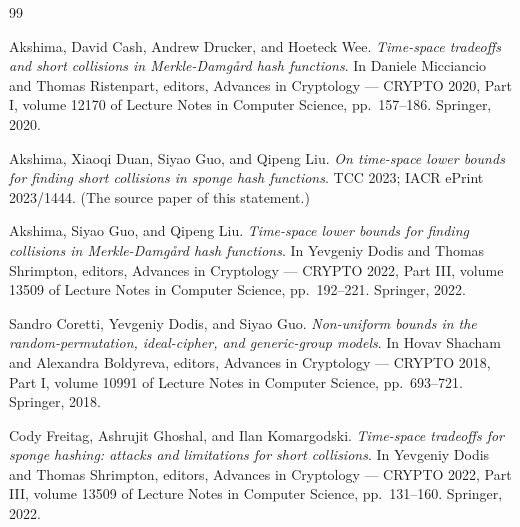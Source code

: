 \documentclass{conjura-conjecture}
\begin{document}
\begin{conjurabibliography}{99}

Akshima, David Cash, Andrew Drucker, and Hoeteck Wee.
\emph{Time-space tradeoffs and short collisions in Merkle-Damg\aa{}rd
hash functions}.
In Daniele Micciancio and Thomas Ristenpart, editors, Advances in
Cryptology --- CRYPTO 2020, Part I, volume 12170 of Lecture Notes in
Computer Science, pp.\ 157--186. Springer, 2020.

Akshima, Xiaoqi Duan, Siyao Guo, and Qipeng Liu.
\emph{On time-space lower bounds for finding short collisions in sponge
hash functions}.
TCC 2023; IACR ePrint 2023/1444. (The source paper of this statement.)

Akshima, Siyao Guo, and Qipeng Liu.
\emph{Time-space lower bounds for finding collisions in
Merkle-Damg\aa{}rd hash functions}.
In Yevgeniy Dodis and Thomas Shrimpton, editors, Advances in Cryptology
--- CRYPTO 2022, Part III, volume 13509 of Lecture Notes in Computer
Science, pp.\ 192--221. Springer, 2022.

Sandro Coretti, Yevgeniy Dodis, and Siyao Guo.
\emph{Non-uniform bounds in the random-permutation, ideal-cipher, and
generic-group models}.
In Hovav Shacham and Alexandra Boldyreva, editors, Advances in
Cryptology --- CRYPTO 2018, Part I, volume 10991 of Lecture Notes in
Computer Science, pp.\ 693--721. Springer, 2018.

Cody Freitag, Ashrujit Ghoshal, and Ilan Komargodski.
\emph{Time-space tradeoffs for sponge hashing: attacks and limitations
for short collisions}.
In Yevgeniy Dodis and Thomas Shrimpton, editors, Advances in Cryptology
--- CRYPTO 2022, Part III, volume 13509 of Lecture Notes in Computer
Science, pp.\ 131--160. Springer, 2022.

\end{conjurabibliography}
\end{document}
